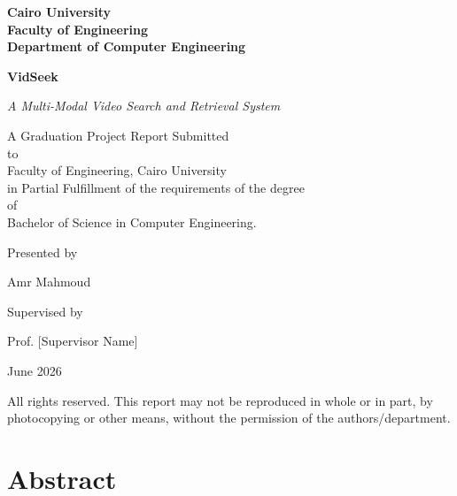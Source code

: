 \documentclass[12pt, a4paper]{report}
\begin{document}
\begin{titlepage}
  \centering

  \vspace*{0.5cm}
  {\Large\bfseries Cairo University\\[0.3em]
   Faculty of Engineering\\[0.3em]
   Department of Computer Engineering}

  \vspace{2.5cm}
  {\Huge\bfseries VidSeek}

  \vspace{0.8cm}
  {\large\itshape A Multi-Modal Video Search and Retrieval System}

  \vspace{2.5cm}
  {\large A Graduation Project Report Submitted\\[0.4em]
   to\\[0.4em]
   Faculty of Engineering, Cairo University\\[0.4em]
   in Partial Fulfillment of the requirements of the degree\\[0.4em]
   of\\[0.4em]
   Bachelor of Science in Computer Engineering.}

  \vspace{2.5cm}
  {\large Presented by}

  \vspace{0.5cm}
  {\large
    Amr Mahmoud\\[0.3em]
  }

  \vspace{2cm}
  {\large Supervised by}

  \vspace{0.5cm}
  {\large Prof. [Supervisor Name]}

  \vfill
  {\large June 2026}

  \vspace{1cm}
  {\small All rights reserved. This report may not be reproduced in whole or in part,
  by photocopying or other means, without the permission of the authors/department.}
\end{titlepage}


\chapter*{Abstract}
\thispagestyle{fancy}
\end{document}
